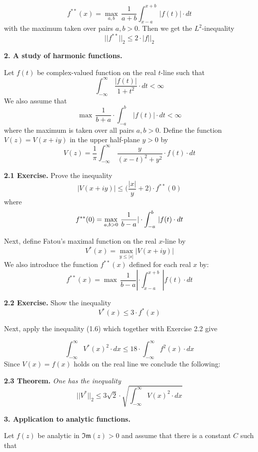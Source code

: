 \[ f^{**}(x)= \max_{a,b}\, 
\frac{1}{a+b}\int_{x-a}^{x+b}\, |f(t)|\cdot dt\tag{**}
\] 
with the maximum taken over pairs $a,b>0$.
Then we get
the $L^2$-inequality
\[
||f^{**}||_2\leq  2\cdot |f||_2\tag{1.6}
\]






\bigskip

\noindent
\centerline {\bf{2. A study of harmonic functions.}}
\medskip

\noindent
Let $f(t)$ be complex-valued function on the real $t$-line
such that
\[
\int_{-\infty}^\infty\, \frac{|f(t)|}{1+t^2}\cdot dt<\infty
\]
We also assume that
\[ 
\max\,\frac{1}{b+a}\cdot \int_{-a}^b\, |f(t)|\cdot dt<\infty
\] 
where the maximum is taken over all pairs $a,b>0$.
Define the function $V(z)= V(x+iy)$ in the upper half-plane $y>0$
by
\[
V(z)= \frac{1}{\pi}\int_{-\infty}^\infty\,
\frac{y}{(x-t)^2+y^2}\cdot f(t)\cdot dt
\]

\medskip

\noindent
{\bf{2.1 Exercise.}}
Prove the inequality
\[ 
|V(x+iy)|\leq \bigl(\frac{|x|}{y}+2\bigr)\cdot f^{**}(0)\tag{1}
\]
where 
\[ 
f^{**}(0)=\max_{a,b>0}\,\frac{1}{b-a}|\cdot \int_{-a}^b\, |f(t)\cdot dt
\]


\medskip

\noindent
Next, define Fatou's maximal function on the real $x$-line by
\[
V^*(x)=\max_{y\leq |s|}
|V(x+iy)|\tag{3}
\]
We also introduce the
function $f^{**}(x)$ defined for each real $x$ by:
\[
f^{**}(x)=\max\,\frac{1}{b-a}|\cdot \int_{x-a}^{x+b}\, |f(t)\cdot dt
\]
\medskip

\noindent
{\bf{2.2 Exercise.}}
Show the inequality
\[ 
V^*(x)\leq 3\cdot f^*(x)
\] 
\medskip

\noindent
Next, apply the inequality (1.6) which together with Exercise 2.2 give 

\[
 \int_{-\infty}^\infty V^*(x)^2\cdot dx\leq 18\cdot 
\int_{-\infty}^\infty f^2(x)\cdot dx\tag{i}
\]
Since  $V(x)= f(x)$ holds on the real line we conclude the following:

\medskip

\noindent
{\bf{2.3 Theorem.}} \emph{One has the inequality}
\[
||V^*||_2\leq 3\sqrt{2}\cdot  
\sqrt{\int_{-\infty}^\infty V(x)^2\cdot dx}\tag{*}
\]
\bigskip

\noindent
\centerline
{\bf{3. Application to analytic functions.}}
\medskip

\noindent
Let $f(z)$ be analytic in $\mathfrak{Im}(z)>0$
and assume that
there is a constant $C$ such that

